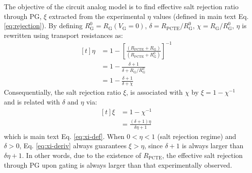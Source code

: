 \documentclass[journal=langd5,email=true, hyperref=true, keywords=false]{achemso}
\begin{document}
The objective of the circuit analog model is to find effective salt
rejection ratio through PG, $\xi$ extracted from the experimental
$\eta$ values (defined in main text Eq. \ref{eq:rejection}). By
defining $R_{\mathrm{G}}^{0}=R_{\mathrm{G}}(V_{\mathrm{G}}=0)$,
$\delta = R_{\mathrm{PCTE}} / R_{\mathrm{G}}^{0}$,
$\chi = R_{\mathrm{G}}/R_{\mathrm{G}}^{0}$, $\eta$ is rewritten using
transport resistances as:
\begin{equation}
  \begin{aligned}[t]
      \label{eq:eta-R}
  \eta &= 1 - {\displaystyle
    \left[\frac{(R_{\mathrm{PCTE}} + R_{\mathrm{G}})}
    {(R_{\mathrm{PCTE}} + R_{\mathrm{G}}^{0})}\right]^{-1}} \\
    &= 1 - \frac{\delta + 1}{\delta + R_{\mathrm{G}}/R_{\mathrm{G}}^{0}} \\
    &= 1 - \frac{\delta + 1}{\delta + \chi}
  \end{aligned}
\end{equation}
Consequentially, the
salt rejection ratio $\xi$, is associated with $\chi$ by
$\xi = 1 - \chi^{-1}$ and is related with $\delta$ and $\eta$ via:
\begin{equation}
  \label{eq:xi-deriv}
  \begin{aligned}[t]
    \xi &= 1 - \chi^{-1} \\
    &= \frac{(\delta + 1) \eta}{\delta\eta + 1}
  \end{aligned}
\end{equation}
which is main text Eq. \ref{eq:xi-def}. When $0<\eta<1$ (salt
rejection regime) and $\delta>0$, Eq. \ref{eq:xi-deriv} always
guarantees $\xi>\eta$, since $\delta + 1$ is always larger than
$\delta\eta + 1$. In other words, due to the existence of
$R_{\mathrm{PCTE}}$, the effective salt rejection through PG upon
gating is always larger than that experimentally observed.
\end{document}
